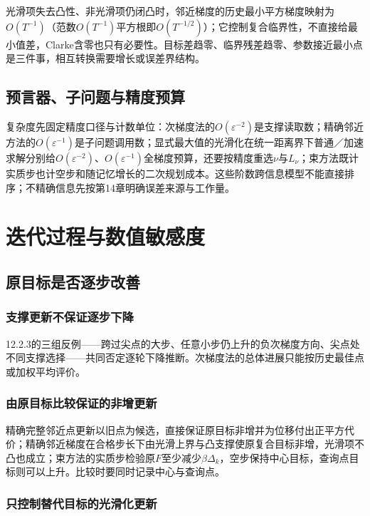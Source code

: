 光滑项失去凸性、非光滑项仍闭凸时，邻近梯度的历史最小平方梯度映射为$O(T^{-1})$（范数$O(T^{-1})$平方根即$O(T^{-1/2})$）；它控制复合临界性，不直接给最小值差，Clarke含零也只有必要性。目标差趋零、临界残差趋零、参数接近最小点是三件事，相互转换需要增长或误差界结构。

\subsection{预言器、子问题与精度预算}

复杂度先固定精度口径与计数单位：次梯度法的$O(\varepsilon^{-2})$是支撑读取数；精确邻近方法的$O(\varepsilon^{-1})$是子问题调用数；显式最大值的光滑化在统一距离界下普通／加速求解分别给$O(\varepsilon^{-2})$、$O(\varepsilon^{-1})$全梯度预算，还要按精度重选$\nu$与$L_\nu$；束方法既计实质步也计空步和随记忆增长的二次规划成本。这些阶数跨信息模型不能直接排序；不精确信息先按第14章明确误差来源与工作量。

\section{迭代过程与数值敏感度}

\subsection{原目标是否逐步改善}

\subsubsection{支撑更新不保证逐步下降}

12.2.3的三组反例——跨过尖点的大步、任意小步仍上升的负次梯度方向、尖点处不同支撑选择——共同否定逐轮下降推断。次梯度法的总体进展只能按历史最佳点或加权平均评价。

\subsubsection{由原目标比较保证的非增更新}

精确完整邻近点更新以旧点为候选，直接保证原目标非增并为位移付出正平方代价；精确邻近梯度在合格步长下由光滑上界与凸支撑使原复合目标非增，光滑项不凸也成立；束方法的实质步检验原$F$至少减少$\beta\Delta_k$，空步保持中心目标，查询点目标则可以上升。比较时要同时记录中心与查询点。

\subsubsection{只控制替代目标的光滑化更新}

